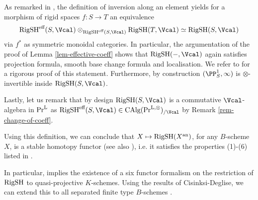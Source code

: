 \documentclass[colorinlistoftodos,article,11pt,reqno]{article}
\newcommand{\RigSH}{\textup{RigSH}}
\newcommand{\eff}{\textup{eff}}
\newcommand{\an}{\textup{an}}
\newcommand{\PrL}{\textup{Pr}^{\textup{L}}}
\newcommand{\PrLO}{\textup{Pr}^{\textup{L},\otimes}}
\newcommand{\CAlgPr}{\textup{CAlg}(\PrLO)}
\begin{document}
\begin{rem}
\label{rem-RigSH-mon}
    As remarked in \cite[\S 6.1]{Hoy-EQ}, the definition of inversion along an element yields for a morphism of rigid spaces $f\colon S\rightarrow T$ an equivalence
    $$
        \RigSH^{\eff}(S,\Vcal) \otimes_{\RigSH^{\eff}(S,\Vcal)}\RigSH(T,\Vcal)\simeq \RigSH(S,\Vcal)
    $$
    via $f^*$ as symmetric monoidal categories. In particular, the argumentation of the proof of Lemma \ref{lem-effective-coeff} shows that $\RigSH(-,\Vcal)$ again satisfies projection formula, smooth base change formula and localisation. We refer to \cite[Prop. 8.5]{DrewMHM} for a rigorous proof of this statement. Furthermore, by construction $(\PP^{1}_{S},\infty)$ is $\otimes$-invertible inside $\RigSH(S,\Vcal)$.

    Lastly, let us remark that by design $\RigSH(S,\Vcal)$ is a commutative $\Vcal$-algebra in $\PrL$ \cite[Def. 2.6]{Robalo-Thesis} as $\RigSH^{\eff}(S,\Vcal)\in \CAlgPr_{/\Vcal}$ by Remark \ref{rem-change-of-coeff}.
\end{rem}



Using this definition, we can conclude that $X\mapsto \RigSH(X^{\an})$, for any $B$-scheme $X$, is a stable homotopy functor \cite{AyoubThesis}  (see also \cite[Prop. 5.11]{DrewMHM}), i.e. it satisfies the properties (1)-(6) listed in \cite[\S 1.4.1]{AyoubThesis}.\par
In particular, \cite[Scholie 1.4.2]{AyoubThesis} implies the existence of a six functor formalism on the restriction of $\RigSH$ to quasi-projective $K$-schemes. Using the results of Cisinksi-Deglise, we can extend this to all separated finite type $B$-schemes \cite[Thm. 2.4.50]{CD1}.
\end{document}
